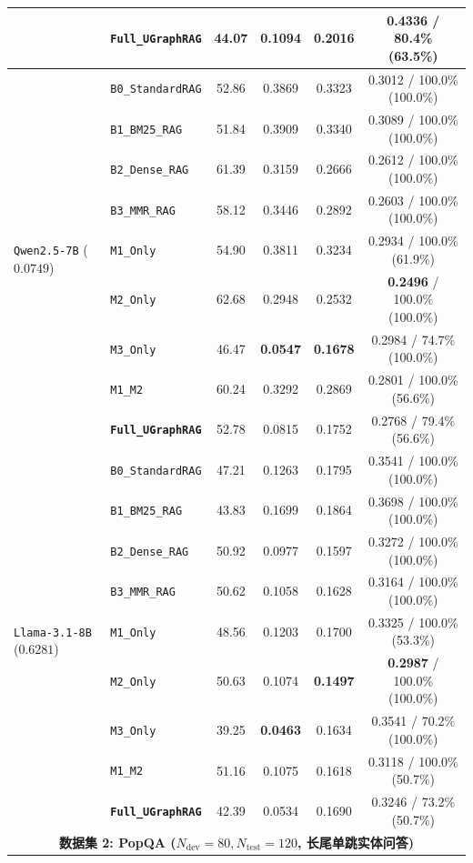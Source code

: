 \documentclass[11pt]{article}
\begin{document}
\begin{table}[t]
{{\begin{tabular}{llcccc}
& \textbf{\texttt{Full\_UGraphRAG}} & 44.07 & 0.1094 & 0.2016 & 0.4336 / 80.4\% (63.5\%) \\
\midrule
\multirow{9}{*}{\texttt{Qwen2.5-7B} ($0.0749$)}
& \texttt{B0\_StandardRAG} & 52.86 & 0.3869 & 0.3323 & 0.3012 / 100.0\% (100.0\%) \\
& \texttt{B1\_BM25\_RAG} & 51.84 & 0.3909 & 0.3340 & 0.3089 / 100.0\% (100.0\%) \\
& \texttt{B2\_Dense\_RAG} & 61.39 & 0.3159 & 0.2666 & 0.2612 / 100.0\% (100.0\%) \\
& \texttt{B3\_MMR\_RAG} & 58.12 & 0.3446 & 0.2892 & 0.2603 / 100.0\% (100.0\%) \\
& \texttt{M1\_Only} & 54.90 & 0.3811 & 0.3234 & 0.2934 / 100.0\% (61.9\%) \\
& \texttt{M2\_Only} & 62.68 & 0.2948 & 0.2532 & \textbf{0.2496} / 100.0\% (100.0\%) \\
& \texttt{M3\_Only} & 46.47 & \textbf{0.0547} & \textbf{0.1678} & 0.2984 / 74.7\% (100.0\%) \\
& \texttt{M1\_M2} & 60.24 & 0.3292 & 0.2869 & 0.2801 / 100.0\% (56.6\%) \\
& \textbf{\texttt{Full\_UGraphRAG}} & 52.78 & 0.0815 & 0.1752 & 0.2768 / 79.4\% (56.6\%) \\
\midrule
\multirow{9}{*}{\texttt{Llama-3.1-8B} ($0.6281$)}
& \texttt{B0\_StandardRAG} & 47.21 & 0.1263 & 0.1795 & 0.3541 / 100.0\% (100.0\%) \\
& \texttt{B1\_BM25\_RAG} & 43.83 & 0.1699 & 0.1864 & 0.3698 / 100.0\% (100.0\%) \\
& \texttt{B2\_Dense\_RAG} & 50.92 & 0.0977 & 0.1597 & 0.3272 / 100.0\% (100.0\%) \\
& \texttt{B3\_MMR\_RAG} & 50.62 & 0.1058 & 0.1628 & 0.3164 / 100.0\% (100.0\%) \\
& \texttt{M1\_Only} & 48.56 & 0.1203 & 0.1700 & 0.3325 / 100.0\% (53.3\%) \\
& \texttt{M2\_Only} & 50.63 & 0.1074 & \textbf{0.1497} & \textbf{0.2987} / 100.0\% (100.0\%) \\
& \texttt{M3\_Only} & 39.25 & \textbf{0.0463} & 0.1634 & 0.3541 / 70.2\% (100.0\%) \\
& \texttt{M1\_M2} & 51.16 & 0.1075 & 0.1618 & 0.3118 / 100.0\% (50.7\%) \\
& \textbf{\texttt{Full\_UGraphRAG}} & 42.39 & 0.0534 & 0.1690 & 0.3246 / 73.2\% (50.7\%) \\
\midrule
\multicolumn{6}{c}{\textbf{数据集 2: PopQA ($N_{\text{dev}}=80, N_{\text{test}}=120$, 长尾单跳实体问答)}} \\

\end{tabular}}}
\end{table}
\end{document}
